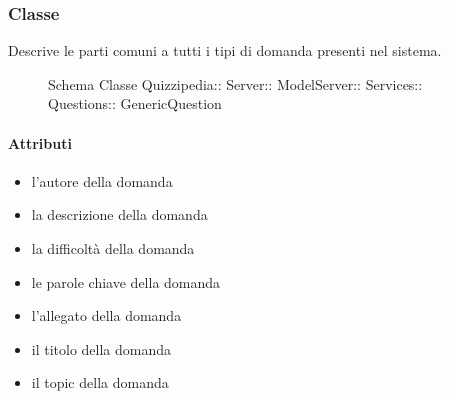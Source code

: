 \subsubsection{Classe }
Descrive le parti comuni a tutti i tipi di domanda presenti nel sistema.
\begin{figure}[H]
\centering
\noindent{}
\caption[Schema Classe GenericQuestion]{Schema Classe Quizzipedia:: Server:: ModelServer:: Services:: Questions:: GenericQuestion}
\end{figure}
\paragraph{Attributi}
\begin{itemize}
\item {}
\newline
l'autore della domanda
\item {}
\newline
la descrizione della domanda
\item {}
\newline
la difficoltà della domanda
\item {}
\newline
le parole chiave della domanda
\item {}
\newline
l'allegato della domanda
\item {}
\newline
il titolo della domanda
\item {}
\newline
il topic della domanda
\end{itemize}
